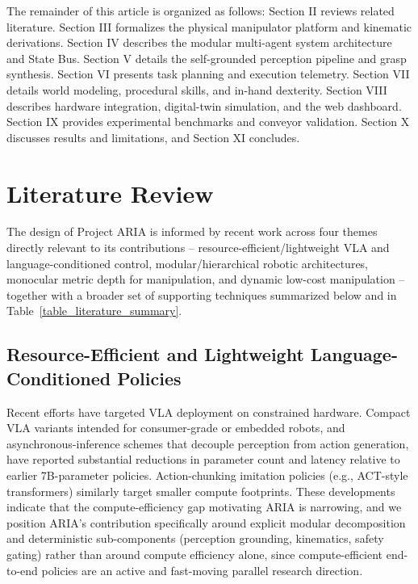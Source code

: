 \documentclass[journal]{IEEEtran}
\begin{document}
The remainder of this article is organized as follows: Section II reviews related literature. Section III formalizes the physical manipulator platform and kinematic derivations. Section IV describes the modular multi-agent system architecture and State Bus. Section V details the self-grounded perception pipeline and grasp synthesis. Section VI presents task planning and execution telemetry. Section VII details world modeling, procedural skills, and in-hand dexterity. Section VIII describes hardware integration, digital-twin simulation, and the web dashboard. Section IX provides experimental benchmarks and conveyor validation. Section X discusses results and limitations, and Section XI concludes.

\section{Literature Review}
The design of Project ARIA is informed by recent work across four themes directly relevant to its contributions -- resource-efficient/lightweight VLA and language-conditioned control, modular/hierarchical robotic architectures, monocular metric depth for manipulation, and dynamic low-cost manipulation -- together with a broader set of supporting techniques summarized below and in Table~\ref{table_literature_summary}.

\subsection{Resource-Efficient and Lightweight Language-Conditioned Policies}
Recent efforts have targeted VLA deployment on constrained hardware. Compact VLA variants intended for consumer-grade or embedded robots, and asynchronous-inference schemes that decouple perception from action generation, have reported substantial reductions in parameter count and latency relative to earlier 7B-parameter policies. Action-chunking imitation policies (e.g., ACT-style transformers) similarly target smaller compute footprints. These developments indicate that the compute-efficiency gap motivating ARIA is narrowing, and we position ARIA's contribution specifically around explicit modular decomposition and deterministic sub-components (perception grounding, kinematics, safety gating) rather than around compute efficiency alone, since compute-efficient end-to-end policies are an active and fast-moving parallel research direction.
\end{document}
